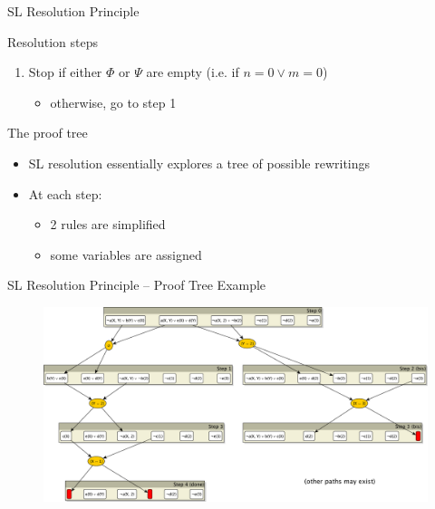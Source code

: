 \documentclass[presentation]{beamer}\mode<presentation>{\usetheme{AMSBolognaFC}}
\begin{document}
\begin{frame}[allowframebreaks]{SL Resolution Principle}
\begin{alertblock}{Resolution steps}
\begin{enumerate}
            \item \alert{Stop} if either $\Phi$ or $\Psi$ are empty (i.e. if \alert{$n = 0 \vee m = 0$})
            \begin{itemize}
                \item \alert{otherwise}, %
                go to step 1
            \end{itemize}
            
        \end{enumerate}
    \end{alertblock}
    \begin{alertblock}{The proof tree}
        \begin{itemize}
            \item SL resolution essentially explores a \alert{tree} of possible \alert{rewritings}
            \item At each step:
            \begin{itemize}
                \item 2 rules are simplified
                \item some variables are assigned
            \end{itemize}
        \end{itemize}
    \end{alertblock}
\end{frame}

\begin{frame}{SL Resolution Principle -- Proof Tree Example}
    \begin{figure}
        \includegraphics[width=\linewidth]{figures/sl-path-all.pdf}
    \end{figure}
\end{frame}
\end{document}
